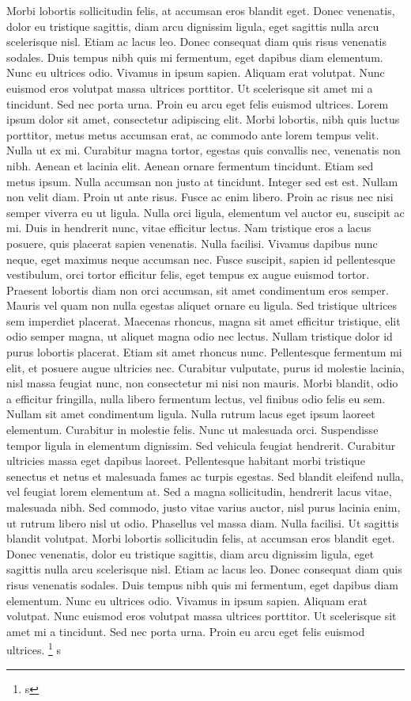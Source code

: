 {Morbi lobortis sollicitudin felis, at accumsan eros blandit eget. Donec venenatis, dolor eu tristique sagittis, diam arcu dignissim ligula, eget sagittis nulla arcu scelerisque nisl. Etiam ac lacus leo. Donec consequat diam quis risus venenatis sodales. Duis tempus nibh quis mi fermentum, eget dapibus diam elementum. Nunc eu ultrices odio. Vivamus in ipsum sapien. Aliquam erat volutpat. Nunc euismod eros volutpat massa ultrices porttitor. Ut scelerisque sit amet mi a tincidunt. Sed nec porta urna. Proin eu arcu eget felis euismod ultrices.
 Lorem ipsum dolor sit amet, consectetur adipiscing elit. Morbi lobortis, nibh quis luctus porttitor, metus metus accumsan erat, ac commodo ante lorem tempus velit. Nulla ut ex mi. Curabitur magna tortor, egestas quis convallis nec, venenatis non nibh. Aenean et lacinia elit. Aenean ornare fermentum tincidunt. Etiam sed metus ipsum. Nulla accumsan non justo at tincidunt. Integer sed est est. Nullam non velit diam. Proin ut ante risus. Fusce ac enim libero. Proin ac risus nec nisi semper viverra eu ut ligula. Nulla orci ligula, elementum vel auctor eu, suscipit ac mi. Duis in hendrerit nunc, vitae efficitur lectus. Nam tristique eros a lacus posuere, quis placerat sapien venenatis.
Nulla facilisi. Vivamus dapibus nunc neque, eget maximus neque accumsan nec. Fusce suscipit, sapien id pellentesque vestibulum, orci tortor efficitur felis, eget tempus ex augue euismod tortor. Praesent lobortis diam non orci accumsan, sit amet condimentum eros semper. Mauris vel quam non nulla egestas aliquet ornare eu ligula. Sed tristique ultrices sem imperdiet placerat. Maecenas rhoncus, magna sit amet efficitur tristique, elit odio semper magna, ut aliquet magna odio nec lectus. Nullam tristique dolor id purus lobortis placerat.
Etiam sit amet rhoncus nunc. Pellentesque fermentum mi elit, et posuere augue ultricies nec. Curabitur vulputate, purus id molestie lacinia, nisl massa feugiat nunc, non consectetur mi nisi non mauris. Morbi blandit, odio a efficitur fringilla, nulla libero fermentum lectus, vel finibus odio felis eu sem. Nullam sit amet condimentum ligula. Nulla rutrum lacus eget ipsum laoreet elementum. Curabitur in molestie felis. Nunc ut malesuada orci.
Suspendisse tempor ligula in elementum dignissim. Sed vehicula feugiat hendrerit. Curabitur ultricies massa eget dapibus laoreet. Pellentesque habitant morbi tristique senectus et netus et malesuada fames ac turpis egestas. Sed blandit eleifend nulla, vel feugiat lorem elementum at. Sed a magna sollicitudin, hendrerit lacus vitae, malesuada nibh. Sed commodo, justo vitae varius auctor, nisl purus lacinia enim, ut rutrum libero nisl ut odio. Phasellus vel massa diam. Nulla facilisi. Ut sagittis blandit volutpat.
Morbi lobortis sollicitudin felis, at accumsan eros blandit eget. Donec venenatis, dolor eu tristique sagittis, diam arcu dignissim ligula, eget sagittis nulla arcu scelerisque nisl. Etiam ac lacus leo. Donec consequat diam quis risus venenatis sodales. Duis tempus nibh quis mi fermentum, eget dapibus diam elementum. Nunc eu ultrices odio. Vivamus in ipsum sapien. Aliquam erat volutpat. Nunc euismod eros volutpat massa ultrices porttitor. Ut scelerisque sit amet mi a tincidunt. Sed nec porta urna. Proin eu arcu eget felis euismod ultrices.
}\footnote{s}
s\vfill\eject

\bye